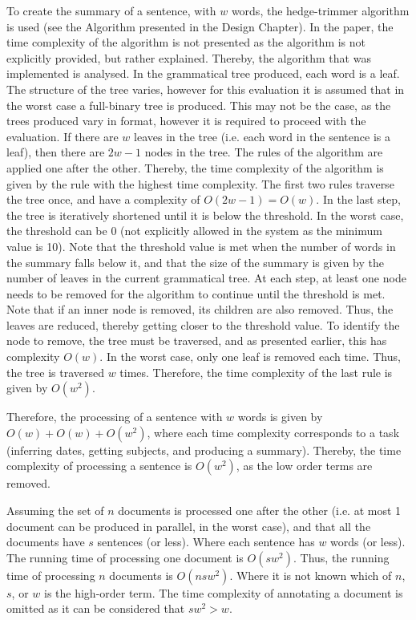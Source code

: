 \par To create the summary of a sentence, with $w$ words, the hedge-trimmer algorithm is used (see the Algorithm presented in the Design Chapter). In the paper, the time complexity of the algorithm is not presented as the algorithm is not explicitly provided, but rather explained. Thereby, the algorithm that was implemented is analysed. In the grammatical tree produced, each word is a leaf. The structure of the tree varies, however for this evaluation it is assumed that in the worst case a full-binary tree is produced. This may not be the case, as the trees produced vary in format, however it is required to proceed with the evaluation. If there are $w$ leaves in the tree (i.e. each word in the sentence is a leaf), then there are $2w-1$ nodes in the tree. The rules of the algorithm are applied one after the other. Thereby, the time complexity of the algorithm is given by the rule with the highest time complexity. The first two rules traverse the tree once, and have a complexity of $O(2w-1) = O(w)$. In the last step, the tree is iteratively shortened until it is below the threshold. In the worst case, the threshold can be 0 (not explicitly allowed in the system as the minimum value is 10). Note that the threshold value is met when the number of words in the summary falls below it, and that the size of the summary is given by the number of leaves in the current grammatical tree. At each step, at least one node needs to be removed for the algorithm to continue until the threshold is met. Note that if an inner node is removed, its children are also removed. Thus, the leaves are reduced, thereby getting closer to the threshold value. To identify the node to remove, the tree must be traversed, and as presented earlier, this has complexity $O(w)$. In the worst case, only one leaf is removed each time. Thus, the tree is traversed $w$ times. Therefore, the time complexity of the last rule is given by $O(w^2)$.

\par Therefore, the processing of a sentence with $w$ words is given by $O(w)+O(w)+O(w^2)$, where each time complexity corresponds to a task (inferring dates, getting subjects, and producing a summary). Thereby, the time complexity of processing a sentence is $O(w^2)$, as the low order terms are removed. 
\par Assuming the set of $n$ documents is processed one after the other (i.e. at most 1 document can be produced in parallel, in the worst case), and that all the documents have $s$ sentences (or less). Where each sentence has $w$ words (or less). The running time of processing one document is $O(sw^2)$. Thus, the running time of processing $n$ documents is $O(nsw^2)$. Where it is not known which of $n$, $s$, or $w$ is the high-order term. The time complexity of annotating a document is omitted as it can be considered that $sw^2 > w$.

